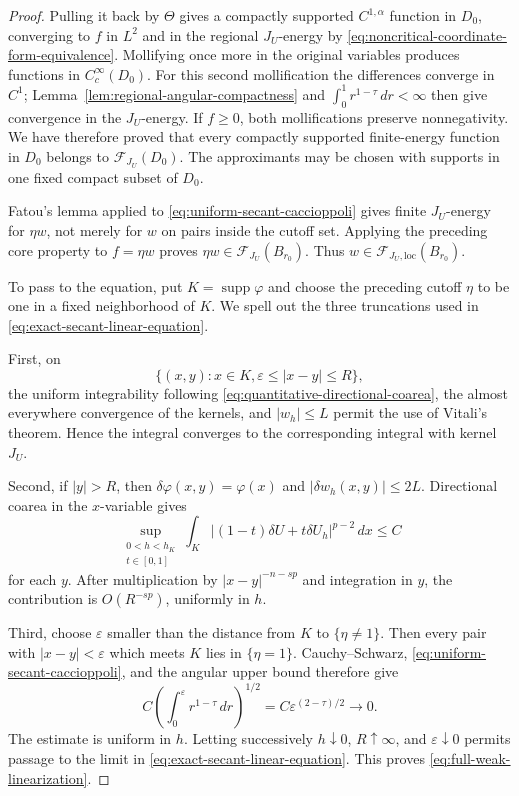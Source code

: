 \documentclass[11pt,reqno]{amsart}
\numberwithin{equation}{section}
\newcommand{\dd}{\,d}
\theoremstyle{remark}
\begin{document}
\begin{proof}
Pulling it back by \(\Theta\) gives a compactly supported
\(C^{1,\alpha}\) function in \(D_0\), converging to \(f\) in
\(L^2\) and in the regional \(J_U\)-energy by
\eqref{eq:noncritical-coordinate-form-equivalence}.  Mollifying once
more in the original variables produces functions in
\(C_c^\infty(D_0)\).  For this second mollification the differences
converge in \(C^1\); Lemma~\ref{lem:regional-angular-compactness} and
\(\int_0^1r^{1-\tau}\dd r<\infty\) then give convergence in the
\(J_U\)-energy.  If \(f\ge0\), both mollifications preserve
nonnegativity.  We have
therefore proved that every compactly supported finite-energy function
in \(D_0\) belongs to \(\mathcal F_{J_U}(D_0)\).  The approximants may
be chosen with supports in one fixed compact subset of \(D_0\).

Fatou's lemma applied to \eqref{eq:uniform-secant-caccioppoli} gives
finite \(J_U\)-energy for \(\eta w\), not merely for \(w\) on pairs
inside the cutoff set.  Applying the preceding core property to
\(f=\eta w\) proves
\(\eta w\in\mathcal F_{J_U}(B_{r_0})\).  Thus
\(w\in\mathcal F_{J_U,\mathrm{loc}}(B_{r_0})\).

To pass to the equation, put
\(K=\operatorname{supp}\varphi\) and choose the preceding cutoff
\(\eta\) to be one in a fixed neighborhood of \(K\).  We spell out the
three truncations used in \eqref{eq:exact-secant-linear-equation}.

First, on
\[
 \{(x,y):x\in K,
       \varepsilon\le|x-y|\le R\},
\]
the uniform integrability following
\eqref{eq:quantitative-directional-coarea}, the almost everywhere
convergence of the kernels, and \(|w_h|\le L\) permit the use of
Vitali's theorem.  Hence the integral converges to the corresponding
integral with kernel \(J_U\).

Second, if \(|y|>R\), then \(\delta\varphi(x,y)=\varphi(x)\) and
\(|\delta w_h(x,y)|\le2L\).  Directional coarea in the \(x\)-variable
gives
\begin{equation*}
 \sup_{\substack{0<h<h_K\\t\in[0,1]}}\int_K
 |(1-t)\delta U+t\delta U_h|^{p-2}\dd x\le C
\end{equation*}
for each \(y\).  After multiplication by
\(|x-y|^{-n-sp}\) and integration in \(y\), the contribution is
\(O(R^{-sp})\), uniformly in \(h\).

Third, choose \(\varepsilon\) smaller than the distance from \(K\) to
\(\{\eta\ne1\}\).  Then every pair with \(|x-y|<\varepsilon\) which
meets \(K\) lies in \(\{\eta=1\}\).  Cauchy--Schwarz,
\eqref{eq:uniform-secant-caccioppoli}, and the angular upper bound
therefore give
\[
 C\left(\int_0^\varepsilon r^{1-\tau}\dd r\right)^{1/2}
 =C\varepsilon^{(2-\tau)/2}\longrightarrow0.
\]
The estimate is uniform in \(h\).  Letting successively
\(h\downarrow0\), \(R\uparrow\infty\), and
\(\varepsilon\downarrow0\) permits passage to the limit in
\eqref{eq:exact-secant-linear-equation}.  This proves
\eqref{eq:full-weak-linearization}.


\end{proof}
\end{document}

